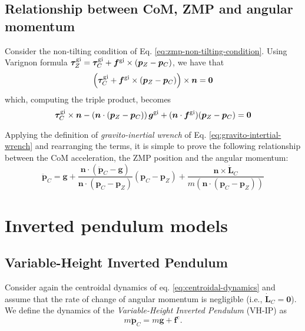 \subsection{Relationship between CoM, ZMP and angular momentum}
Consider the non-tilting condition of Eq. \eqref{eq:zmp-non-tilting-condition}. Using Varignon formula $\bm{\tau}_Z^{\rm gi} = \bm{\tau}_C^{\rm gi} + \bm{f}^{\rm gi} \times (\bm{p}_Z - \bm{p}_C)$, we have that
\begin{equation}
    \left(\bm{\tau}_C^{\rm gi} + \bm{f}^{\rm gi} \times (\bm{p}_Z - \bm{p}_C)\right) \times \bm{n} = \bm{0}
\end{equation}
which, computing the triple product, becomes
\begin{equation}
    \bm{\tau}_C^{\rm gi} \times \bm{n} - \left(\bm{n} \cdot (\bm{p}_Z - \bm{p}_C)\right) \bm{g}^{\rm gi} + (\bm{n} \cdot \bm{f}^{\rm gi}) (\bm{p}_Z - \bm{p}_C) = \bm{0}
\end{equation}

Applying the definition of \textit{gravito-inertial wrench} of Eq. \eqref{eq:gravito-intertial-wrench} and rearranging the terms, it is simple to prove \cite{Caron2017TRO} the following relationship between the CoM acceleration, the ZMP position and the angular momentum:
\begin{equation}
    \label{eq:relationship-com-zmp-angular-momentum}
    \ddot{\bm{p}}_C = \bm{g} + \frac{\bm{n} \cdot (\bm{\ddot{p}}_C - \bm{g})}{\bm{n} \cdot (\bm{p}_C - \bm{p}_Z)} (\bm{p}_C - \bm{p}_Z) + \frac{\bm{n} \times \bm{\dot{L}}_C}{m \left(\bm{n} \cdot (\bm{p}_C - \bm{p}_Z)\right)}
\end{equation}
\section{Inverted pendulum models}
\subsection{Variable-Height Inverted Pendulum}
Consider again the centroidal dynamics of eq. \eqref{eq:centroidal-dynamics}
and assume that the rate of change of angular momentum is negligible (i.e.,
$\dot{\bm{L}}_C=\bm{0}$). We define the dynamics of the \textit{Variable-Height
Inverted Pendulum} (VH-IP) \cite{Koolen2016VHIP} as
\begin{equation}
    \label{eq:VH-IP}
    m \ddot{\bm{p}}_C = m \bm{g} + \bm{f}^{\mathrm{c}}.
\end{equation}

